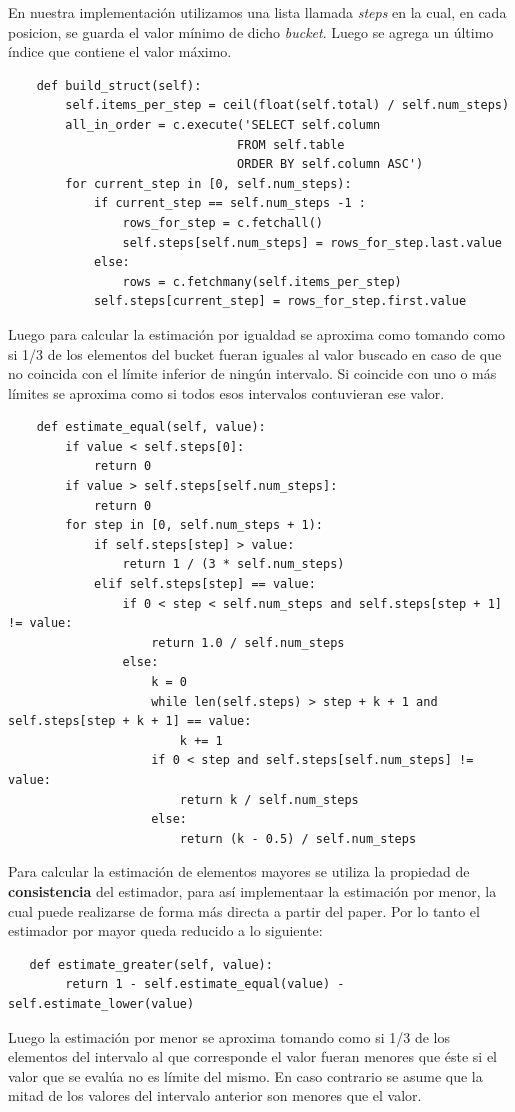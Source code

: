 \documentclass[a4paper, 10pt, twoside]{article}
\begin{document}
 En nuestra implementación utilizamos una lista llamada \textit{steps} en la cual, en cada posicion, se guarda el valor mínimo de dicho \textit{bucket}. Luego se agrega un último índice que contiene el valor máximo.
\begin{verbatim}
    def build_struct(self):
        self.items_per_step = ceil(float(self.total) / self.num_steps)
        all_in_order = c.execute('SELECT self.column 
        						FROM self.table 
        						ORDER BY self.column ASC')
        for current_step in [0, self.num_steps):
            if current_step == self.num_steps -1 :
                rows_for_step = c.fetchall()
                self.steps[self.num_steps] = rows_for_step.last.value
            else:
                rows = c.fetchmany(self.items_per_step)
            self.steps[current_step] = rows_for_step.first.value
\end{verbatim}
Luego para calcular la estimación por igualdad se aproxima como tomando como si 1/3 de los elementos del bucket fueran iguales al valor buscado en caso de que no coincida con el límite inferior de ningún intervalo. Si coincide con uno o más límites se aproxima como si todos esos intervalos contuvieran ese valor.
\begin{verbatim}
    def estimate_equal(self, value):
        if value < self.steps[0]:
            return 0
        if value > self.steps[self.num_steps]:
            return 0
        for step in [0, self.num_steps + 1):
            if self.steps[step] > value:
                return 1 / (3 * self.num_steps)
            elif self.steps[step] == value:
                if 0 < step < self.num_steps and self.steps[step + 1] != value:
                    return 1.0 / self.num_steps
                else:
                    k = 0
                    while len(self.steps) > step + k + 1 and self.steps[step + k + 1] == value:
                        k += 1
                    if 0 < step and self.steps[self.num_steps] != value:
                        return k / self.num_steps
                    else:
                        return (k - 0.5) / self.num_steps
\end{verbatim}
 Para calcular la estimación de elementos mayores se utiliza la propiedad de \textbf{consistencia} del estimador, para así implementaar la estimación por menor, la cual puede realizarse de forma más directa a partir del paper. Por lo tanto el estimador por mayor queda reducido a lo siguiente:
  
 \begin{verbatim}
   def estimate_greater(self, value):
        return 1 - self.estimate_equal(value) - self.estimate_lower(value)
 \end{verbatim}
 Luego la estimación por menor se aproxima tomando como si 1/3 de los
elementos del intervalo al que corresponde el valor fueran menores que éste si el valor que se evalúa no es límite del mismo. En caso contrario se asume que la mitad de los valores del intervalo anterior son menores que el valor.
\end{document}
